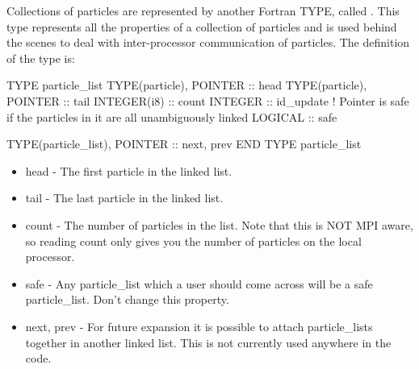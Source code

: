 Collections of particles are represented by another Fortran TYPE, called
. This type represents all the properties of a
collection of particles and is used behind the scenes to deal with
inter-processor communication of particles. The definition of the type is:
\begin{boxverbatim}
  TYPE particle_list
    TYPE(particle), POINTER :: head
    TYPE(particle), POINTER :: tail
    INTEGER(i8) :: count
    INTEGER :: id_update
    ! Pointer is safe if the particles in it are all unambiguously linked
    LOGICAL :: safe

    TYPE(particle_list), POINTER :: next, prev
  END TYPE particle_list
\end{boxverbatim}
\begin{itemize}
\item head - The first particle in the linked list.
\item tail - The last particle in the linked list.
\item count - The number of particles in the list. Note that this is NOT MPI
  aware, so reading count only gives you the number of particles on the local
  processor.
\item safe - Any particle\_list which a user should come across will be a safe
  particle\_list. Don't change this property.
\item next, prev - For future expansion it is possible to attach particle\_lists
  together in another linked list. This is not currently used anywhere in the
  code.
\end{itemize}

